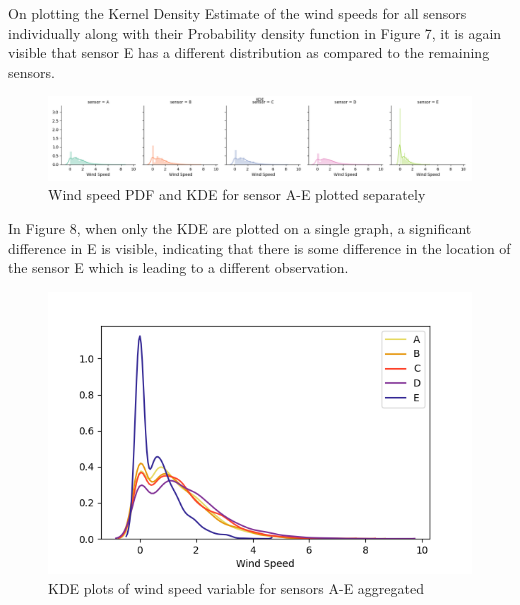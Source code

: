\documentclass[a4paper]{article}
\begin{document}
On plotting the Kernel Density Estimate of the wind speeds for all sensors individually along with their Probability density function in Figure 7, it is again visible that sensor E has a different distribution as compared to the remaining sensors. 
\begin{figure}[H]
\includegraphics[width=17cm]{images/a2_3.png}
\centering
\caption{Wind speed PDF and KDE for sensor A-E plotted separately}
\end{figure}
In Figure 8, when only the KDE are plotted on a single graph, a significant difference in E is visible, indicating that there is some difference in the location of the sensor E which is leading to a different observation. 
\begin{figure}[H]
\includegraphics[width=17cm]{images/a2_4.png}
\centering
\caption{KDE plots of wind speed variable for sensors A-E aggregated}
\end{figure}

\newpage
\end{document}
